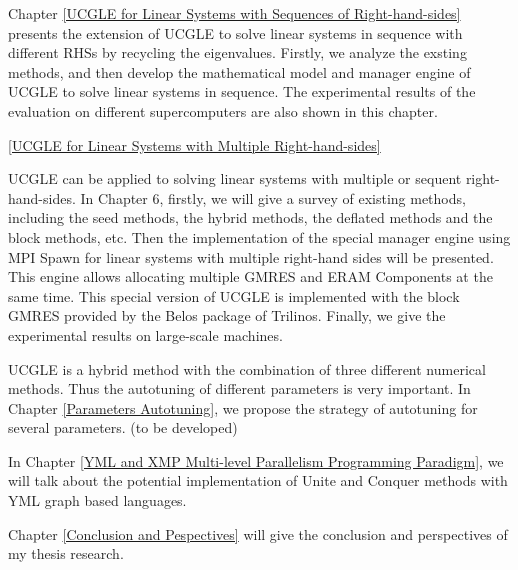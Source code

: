 Chapter \ref{UCGLE for Linear Systems with Sequences of Right-hand-sides} presents the extension of UCGLE to solve linear systems in sequence with different RHSs by recycling the eigenvalues. Firstly, we analyze the exsting methods, and then develop the mathematical model and manager engine of UCGLE to solve linear systems in sequence. The experimental results of the evaluation on different supercomputers are also shown in this chapter.

\ref{UCGLE for Linear Systems with Multiple Right-hand-sides}

UCGLE can be applied to solving linear systems with multiple or sequent right-hand-sides. In Chapter 6, firstly, we will give a survey of existing methods, including the seed methods, the hybrid methods, the deflated methods and the block methods, etc. Then the implementation of the special manager engine using MPI Spawn for linear systems with multiple right-hand sides will be presented. This engine allows allocating multiple GMRES and ERAM Components at the same time. This special version of UCGLE is implemented with the block GMRES provided by the Belos package of Trilinos. Finally, we give the experimental results on large-scale machines.

UCGLE is a hybrid method with the combination of three different numerical methods. Thus the autotuning of different parameters is very important. In Chapter \ref{Parameters Autotuning}, we propose the strategy of autotuning for several parameters. (to be developed)

In Chapter \ref{YML and XMP Multi-level Parallelism Programming Paradigm}, we will talk about the potential implementation of Unite and Conquer methods with YML graph based languages. 

Chapter \ref{Conclusion and Pespectives} will give the conclusion and perspectives of my thesis research.